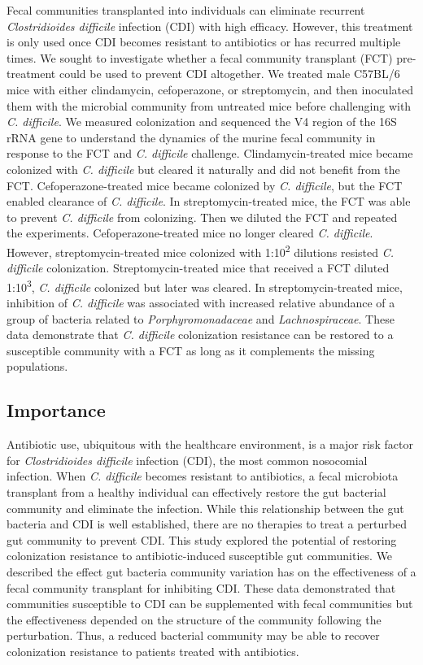 \documentclass[
  12pt,
]{article}
\begin{document}
Fecal communities transplanted into individuals can eliminate recurrent
\emph{Clostridioides difficile} infection (CDI) with high efficacy.
However, this treatment is only used once CDI becomes resistant to
antibiotics or has recurred multiple times. We sought to investigate
whether a fecal community transplant (FCT) pre-treatment could be used
to prevent CDI altogether. We treated male C57BL/6 mice with either
clindamycin, cefoperazone, or streptomycin, and then inoculated them
with the microbial community from untreated mice before challenging with
\emph{C. difficile}. We measured colonization and sequenced the V4
region of the 16S rRNA gene to understand the dynamics of the murine
fecal community in response to the FCT and \emph{C. difficile}
challenge. Clindamycin-treated mice became colonized with \emph{C.
difficile} but cleared it naturally and did not benefit from the FCT.
Cefoperazone-treated mice became colonized by \emph{C. difficile}, but
the FCT enabled clearance of \emph{C. difficile}. In
streptomycin-treated mice, the FCT was able to prevent \emph{C.
difficile} from colonizing. Then we diluted the FCT and repeated the
experiments. Cefoperazone-treated mice no longer cleared \emph{C.
difficile}. However, streptomycin-treated mice colonized with
1:10\textsuperscript{2} dilutions resisted \emph{C. difficile}
colonization. Streptomycin-treated mice that received a FCT diluted
1:10\textsuperscript{3}, \emph{C. difficile} colonized but later was
cleared. In streptomycin-treated mice, inhibition of \emph{C. difficile}
was associated with increased relative abundance of a group of bacteria
related to \emph{Porphyromonadaceae} and \emph{Lachnospiraceae}. These
data demonstrate that \emph{C. difficile} colonization resistance can be
restored to a susceptible community with a FCT as long as it complements
the missing populations.

\hypertarget{importance}{%
\subsection{Importance}\label{importance}}

Antibiotic use, ubiquitous with the healthcare environment, is a major
risk factor for \emph{Clostridioides difficile} infection (CDI), the
most common nosocomial infection. When \emph{C. difficile} becomes
resistant to antibiotics, a fecal microbiota transplant from a healthy
individual can effectively restore the gut bacterial community and
eliminate the infection. While this relationship between the gut
bacteria and CDI is well established, there are no therapies to treat a
perturbed gut community to prevent CDI. This study explored the
potential of restoring colonization resistance to antibiotic-induced
susceptible gut communities. We described the effect gut bacteria
community variation has on the effectiveness of a fecal community
transplant for inhibiting CDI. These data demonstrated that communities
susceptible to CDI can be supplemented with fecal communities but the
effectiveness depended on the structure of the community following the
perturbation. Thus, a reduced bacterial community may be able to recover
colonization resistance to patients treated with antibiotics.
\end{document}
